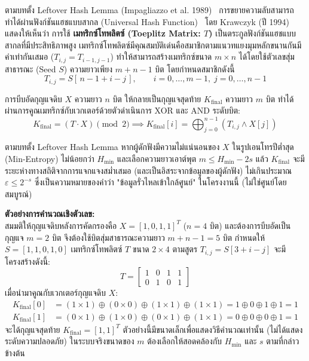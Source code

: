 ตามบทตั้ง Leftover Hash Lemma (Impagliazzo et al. 1989)~\cite{impagliazzo_leftover_hash} การขยายความลับสามารถทำได้ผ่านฟังก์ชันแฮชแบบสากล (Universal Hash Function)~\cite{carter_wegman_universal} โดย Krawczyk (ปี 1994)~\cite{krawczyk_toeplitz} แสดงให้เห็นว่า การใช้ \textbf{เมทริกซ์โทพลิตซ์ (Toeplitz Matrix: $T$)} เป็นตระกูลฟังก์ชันแฮชแบบสากลที่มีประสิทธิภาพสูง เมทริกซ์โทพลิตซ์มีคุณสมบัติเด่นคือสมาชิกตามแนวทแยงมุมหลักขนานกันมีค่าเท่ากันเสมอ ($T_{i, j} = T_{i-1, j-1}$) ทำให้สามารถสร้างเมทริกซ์ขนาด $m \times n$ ได้โดยใช้ตัวเลขสุ่มสาธารณะ (Seed $S$) ความยาวเพียง $m + n - 1$ บิต โดยกำหนดสมาชิกดังนี้
\begin{equation}
    T_{i,j} = S[\,n - 1 + i - j\,], \qquad i = 0,\dots,m-1,\; j = 0,\dots,n-1
\end{equation}

การบีบอัดกุญแจดิบ $X$ ความยาว $n$ บิต ให้กลายเป็นกุญแจสุดท้าย $K_{\text{final}}$ ความยาว $m$ บิต ทำได้ผ่านการคูณเมทริกซ์กับเวกเตอร์ด้วยตัวดำเนินการ XOR และ AND ระดับบิต:
\begin{equation}
    K_{\text{final}} = (T \cdot X) \pmod 2 \implies K_{\text{final}}[i] = \bigoplus_{j=0}^{n-1} (T_{i, j} \land X[j])
\end{equation}

ตามบทตั้ง Leftover Hash Lemma หากผู้ดักฟังมีความไม่แน่นอนของ $X$ ในรูปเอนโทรปีต่ำสุด (Min-Entropy) ไม่น้อยกว่า $H_{\min}$ และเลือกความยาวเอาต์พุต $m \le H_{\min} - 2s$ แล้ว $K_{\text{final}}$ จะมีระยะห่างทางสถิติจากการแจกแจงสม่ำเสมอ (และเป็นอิสระจากข้อมูลของผู้ดักฟัง) ไม่เกินประมาณ $\varepsilon \le 2^{-s}$ ซึ่งเป็นความหมายของคำว่า "ข้อมูลรั่วไหลเข้าใกล้ศูนย์" ในโครงงานนี้ (ไม่ใช่ศูนย์โดยสมบูรณ์)

\noindent \textbf{ตัวอย่างการคำนวณเชิงตัวเลข:}\\
สมมติให้กุญแจดิบหลังการคัดกรองคือ $X = [1, 0, 1, 1]^T$ ($n=4$ บิต) และต้องการบีบอัดเป็นกุญแจ $m=2$ บิต จึงต้องใช้บิตสุ่มสาธารณะความยาว $m + n - 1 = 5$ บิต กำหนดให้ $S = [1, 1, 0, 1, 0]$ เมทริกซ์โทพลิตซ์ $T$ ขนาด $2 \times 4$ ตามสูตร $T_{i,j} = S[3 + i - j]$ จะมีโครงสร้างดังนี้:
\begin{equation}
    T = \begin{bmatrix}
        1 & 0 & 1 & 1 \\
        0 & 1 & 0 & 1
    \end{bmatrix}
\end{equation}
เมื่อนำมาคูณกับเวกเตอร์กุญแจดิบ $X$:
\begin{align}
    K_{\text{final}}[0] &= (1 \times 1) \oplus (0 \times 0) \oplus (1 \times 1) \oplus (1 \times 1) = 1 \oplus 0 \oplus 1 \oplus 1 = 1 \\
    K_{\text{final}}[1] &= (0 \times 1) \oplus (1 \times 0) \oplus (0 \times 1) \oplus (1 \times 1) = 0 \oplus 0 \oplus 0 \oplus 1 = 1
\end{align}
จะได้กุญแจสุดท้าย $K_{\text{final}} = [1, 1]^T$ ตัวอย่างนี้มีขนาดเล็กเพื่อแสดงวิธีคำนวณเท่านั้น (ไม่ได้แสดงระดับความปลอดภัย) ในระบบจริงขนาดของ $m$ ต้องเลือกให้สอดคล้องกับ $H_{\min}$ และ $s$ ตามที่กล่าวข้างต้น

